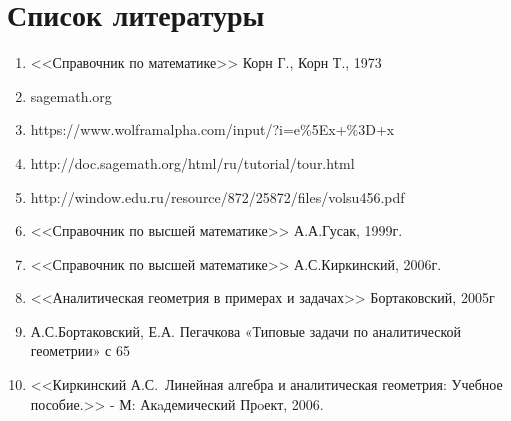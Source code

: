 \section{Список литературы}
	\begin{enumerate}
		\item{<<Справочник по математике>> Корн Г., Корн Т., 1973}
		\item{sagemath.org}
		\item{https://www.wolframalpha.com/input/?i=e\%5Ex+\%3D+x }
		\item{http://doc.sagemath.org/html/ru/tutorial/tour.html}
		\item{http://window.edu.ru/resource/872/25872/files/volsu456.pdf}
		\item{<<Справочник по высшей математике>> А.А.Гусак, 1999г.}
		\item{<<Справочник по высшей математике>> А.С.Киркинский, 2006г. }
		\item{<<Аналитическая геометрия в примерах и задачах>> Бортаковский, 2005г}
		\item{А.С.Бортаковский, Е.А. Пегачкова «Типовые задачи по аналитической геометрии» с 65}
		\item{<<Киркинский А.С. Линейная алгебра и аналитическая геометрия: Учебное пособие.>> - М: Акaдемический Прoект, 2006.}
	\end{enumerate}
	